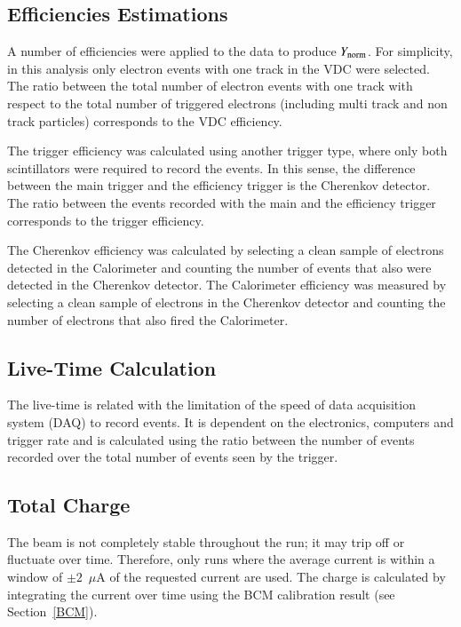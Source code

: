 \documentclass[final,5p,times,twocolumn]{elsarticle}
\begin{document}
\subsection{Efficiencies Estimations } 
 
A number of efficiencies were applied to the data to produce $Y_{\rm{norm}}$.  For simplicity, in this analysis 
only electron events with one track in the VDC were selected.  
The ratio between the total number of electron events with one track with respect to the total number of triggered 
electrons (including multi track and non track particles) corresponds to the VDC efficiency. 

The trigger efficiency 
was calculated using another trigger type, where only both scintillators were required to record the events. 
In this sense, the difference between the main trigger and the efficiency trigger is the Cherenkov detector.  
The ratio between the events recorded with the main and the efficiency trigger corresponds to the trigger efficiency. 

The Cherenkov efficiency was calculated by selecting a clean sample of electrons detected in the Calorimeter 
and counting the number of events that also were detected in the Cherenkov detector. The Calorimeter efficiency 
was measured by selecting a clean sample of electrons in the Cherenkov detector and counting the number of 
electrons that also fired the Calorimeter.

\subsection{Live-Time Calculation } 

The live-time is related with the limitation of the speed of data acquisition system (DAQ) to record events. It is dependent on the electronics, computers and trigger rate and is calculated using the ratio between the number of events recorded over the total number of events seen by the trigger. 

\subsection{ Total Charge}

The beam is not completely stable throughout the run; it may trip off or fluctuate over time. Therefore, only runs 
where the average current is within a window of $\pm 2$~$\mu$A of the requested current are used. 
The charge is calculated by integrating the current over time using the BCM calibration result (see Section~\ref{BCM}).
\end{document}
